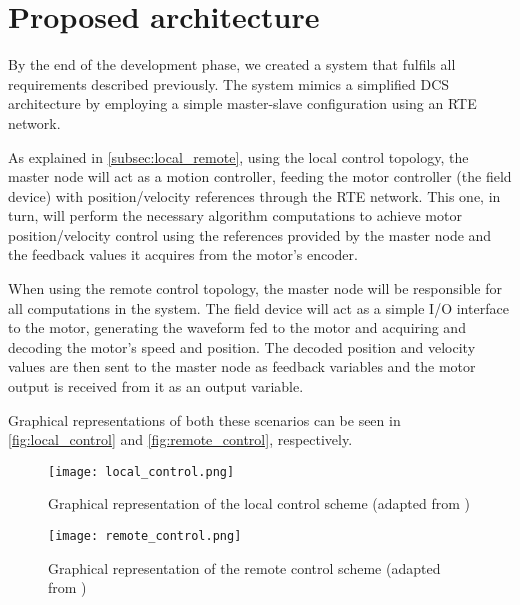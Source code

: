 \section{Proposed architecture} \label{sec:proposed-arch}

By the end of the development phase, we created a system that fulfils all requirements described previously.
The system mimics a simplified DCS architecture by employing a simple master-slave configuration using an RTE network.

As explained in \autoref{subsec:local_remote}, using the local control topology, the master node will act as a motion controller, feeding the motor controller (the field device) with position/velocity references through the RTE network.
This one, in turn, will perform the necessary algorithm computations to achieve motor position/velocity control using the references provided by the master node and the feedback values it acquires from the motor's encoder.

When using the remote control topology, the master node will be responsible for all computations in the system.
The field device will act as a simple I/O interface to the motor, generating the waveform fed to the motor and acquiring and decoding the motor's speed and position.
The decoded position and velocity values are then sent to the master node as feedback variables and the motor output is received from it as an output variable.

Graphical representations of both these scenarios can be seen in \autoref{fig:local_control} and \autoref{fig:remote_control}, respectively. 

\begin{figure}[htp]
	\centering
	\texttt{[image: local\_control.png]}
	\caption{Graphical representation of the local control scheme (adapted from \cite{rte:motion-control-over-rte})}
	\label{fig:local_control}
\end{figure}

\begin{figure}[htp]
	\centering
	\texttt{[image: remote\_control.png]}
	\caption{Graphical representation of the remote control scheme (adapted from \cite{rte:motion-control-over-rte})}
	\label{fig:remote_control}
\end{figure}





